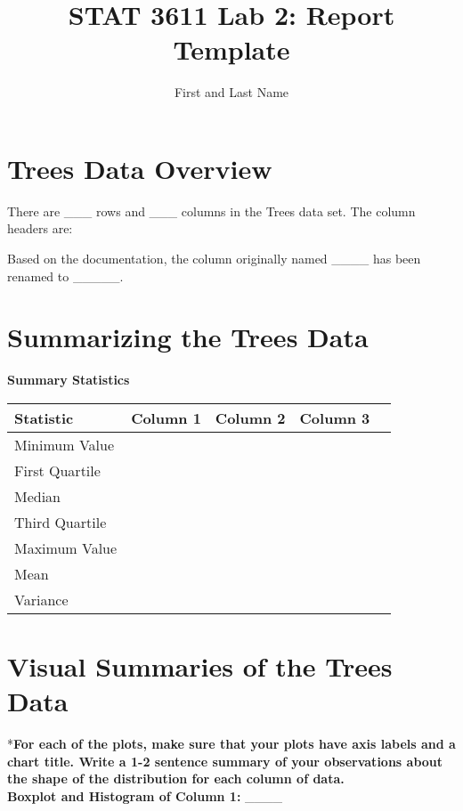 \documentclass{article}
\title{STAT 3611 Lab 2: Report Template}
\author{First and Last Name}
\date{}
\begin{document}
\maketitle

\section*{Trees Data Overview}
There are \_\_\_ rows and \_\_\_ columns in the Trees data set. The column headers are: 

\vspace{0.5cm}

Based on the documentation, the column originally named \_\_\_\_ has been renamed to \_\_\_\_\_.

\section*{Summarizing the Trees Data}
\textbf{Summary Statistics}

\begin{tabular}{@{}lcccc@{}}
\toprule
Statistic         & Column 1 & Column 2 & Column 3 \\ \midrule
Minimum Value     &          &          &          \\
First Quartile    &          &          &          \\
Median            &          &          &          \\
Third Quartile    &          &          &          \\
Maximum Value     &          &          &          \\
Mean              &          &          &          \\
Variance          &          &          &          \\ \bottomrule
\end{tabular}

\vspace{1cm}

\section*{Visual Summaries of the Trees Data}
*\textbf {For each of the plots, make sure that your plots have axis labels and a chart title.  Write a 1-2 sentence summary of your observations about the shape of the distribution for each column of data.}\\

\textbf{Boxplot and Histogram of Column 1:} \_\_\_\_
\end{document}
